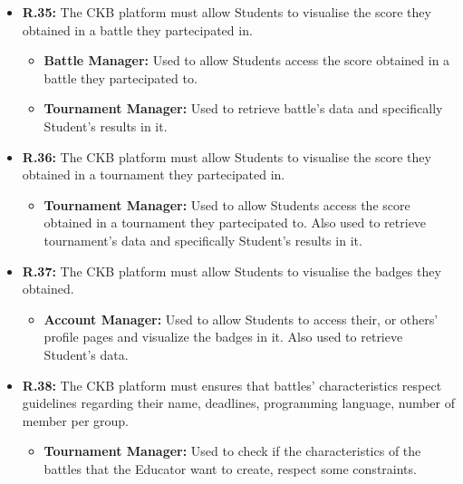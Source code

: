 \documentclass{article}
\begin{document}
{\begin{itemize}
\begin{itemize}
              registered to the tournament in which the battle will take place.
              \item \textbf{Account Manager:} Used to retrieve Students' data.
          \end{itemize}
    \item \textbf{R.35:} The CKB platform must allow Students to visualise the score they obtained in a battle they partecipated in.
          \begin{itemize}
              \item \textbf{Battle Manager:} Used to allow Students access the score obtained
              in a battle they partecipated to.
              \item \textbf{Tournament Manager:} Used to retrieve battle's data and specifically
              Student's results in it.
          \end{itemize}
    \item \textbf{R.36:} The CKB platform must allow Students to visualise the score they obtained in a tournament they partecipated in.
          \begin{itemize}
            \item \textbf{Tournament Manager:} Used to allow Students access the score obtained
            in a tournament they partecipated to. Also used to retrieve tournament's data and 
            specifically Student's results in it.
          \end{itemize}
    \item \textbf{R.37:} The CKB platform must allow Students to visualise the badges they obtained.
          \begin{itemize}
              \item \textbf{Account Manager:} Used to allow Students to access their, or others'
              profile pages and visualize the badges in it. Also used to retrieve Student's data.
          \end{itemize}
    \item \textbf{R.38:} The CKB platform must ensures that battles' characteristics respect guidelines
          regarding their name, deadlines, programming language, number of member per group.
          \begin{itemize}
            \item \textbf{Tournament Manager:} Used to check if the characteristics of the battles
              that the Educator want to create, respect some constraints.
          \end{itemize}
\end{itemize}

}
\end{document}
